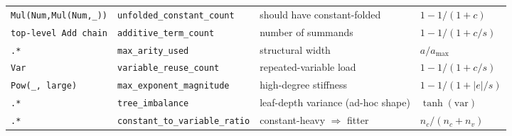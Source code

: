 \documentclass[sigconf]{acmart}
\begin{document}
\begin{table}[t]
\begin{tabular}{@{}llp{3.6cm}l@{}}
\texttt{Mul(Num,Mul(Num,\_))} & \texttt{unfolded\_constant\_count} & should have constant-folded & $1-1/(1+c)$ \\
\texttt{top-level Add chain} & \texttt{additive\_term\_count} & number of summands & $1-1/(1+c/s)$ \\
\texttt{.*} & \texttt{max\_arity\_used} & structural width & $a/a_{\max}$ \\
\texttt{Var} & \texttt{variable\_reuse\_count} & repeated-variable load & $1-1/(1+c/s)$ \\
\texttt{Pow(\_, large)} & \texttt{max\_exponent\_magnitude} & high-degree stiffness & $1-1/(1+|e|/s)$ \\
\texttt{.*} & \texttt{tree\_imbalance} & leaf-depth variance (ad-hoc shape) & $\tanh(\mathrm{var})$ \\
\texttt{.*} & \texttt{constant\_to\_variable\_ratio} & constant-heavy $\Rightarrow$ fitter & $n_c/(n_c{+}n_v)$ \\
\bottomrule
\end{tabular}
\end{table}
\end{document}

